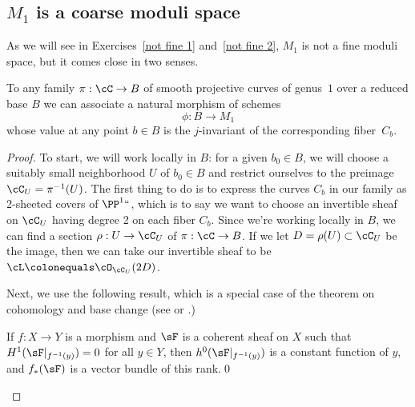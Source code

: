 \subsection*{$M_1$ is a coarse moduli space}

 As we will see in Exercises~\ref{not fine 1} and~\ref{not fine 2},
$M_1$ is not a fine moduli space, but it comes close in two senses.

\begin{proposition}\label{M1 is coarse}
To any family $\pi : \cC \to B$  of smooth projective curves of
genus~$1$ over a reduced base $B$ we can associate a natural morphism of
schemes $$\phi : B \to M_1$$ whose value at any point $b \in B$ is the
$j$-invariant of the corresponding fiber~$C_b$.
\end{proposition}

\begin{proof}
To start, we will work locally in $B$: for a given $b_0 \in B$, we
will choose a suitably small neighborhood $U$ of $b_0 \in B$ and
restrict ourselves to the preimage $\cC_U = \pi^{-1}(U)$. The first
thing to do is to express the curves $C_b$ in our family as
2-sheeted covers
%
of $\PP^1` `$, which is to say we want to choose an invertible sheaf
on $\cC_U$ having degree 2 on each fiber $C_b$. Since we're working
locally in $B$,
we can find a section $\rho : U \to \cC_U$ of $\pi : \cC \to B$. If we let $D = \rho(U) \subset \cC_U$ be the image, then we can take our invertible sheaf to be $\cL \colonequals  \cO_{\cC_U}(2D)$.

Next, we use the following result, which is a special case of the theorem on cohomology and base change
(see  \cite[Appendix, Theorems B.5 and B.9]{3264} or
\cite[Theorem 12.11]{Hartshorne1977}.)

\begin{theorem}
If $f: X\to Y$ is a morphism and $\sF$ is
%
%
a coherent sheaf on $X$ such that $H^{1}(\sF|_{f^{-1}(y)})= 0$ for all $y\in Y$, then
$h^{0}(\sF|_{f^{-1}(y)})$ is a constant function of $y$, and
$f_{*}(\sF)$ is a vector bundle of this rank.\qed
\end{theorem}


\end{proof}
